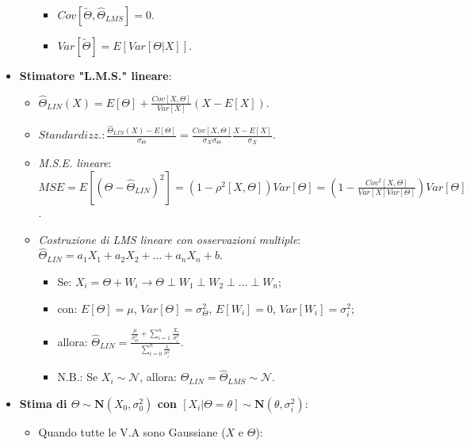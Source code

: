 \documentclass[8pt]{extarticle}
\begin{document}
\begin{multicols*}{3}
\begin{itemize}
\begin{itemize}
\begin{itemize}
                            \item $Cov[\widetilde{\Theta}, \hat{\Theta}_{LMS}]=0$.
                            \item $Var[\widetilde{\Theta}]=E[Var[\Theta|X]]$.
                        \end{itemize}
              \end{itemize}
        \item \textbf{Stimatore "L.M.S." lineare}:
              \begin{itemize}
                  \item $\hat{\Theta}_{LIN}(X)=E[\Theta]+\frac{Cov[X, \Theta]}{Var[X]}(X-E[X]).$
                  \item $Standardizz.: \frac{\hat{\Theta}_{LIN}(X)-E[\Theta]}{\sigma_{\Theta}}=\frac{Cov[X,\Theta]}{\sigma_{X}\sigma_{\Theta}}\frac{X-E[X]}{\sigma_{X}}$.
                  \item \textit{M.S.E. lineare}: $MSE=E[(\Theta-\hat{\Theta}_{LIN})^2]=(1-\rho^{2}[X,\Theta])Var[\Theta]=(1-\frac{Cov^{2}[X,\Theta]}{Var[X]Var[\Theta]})Var[\Theta]$.
                  \item \textit{Costruzione di LMS lineare con osservazioni multiple}: $\hat{\Theta}_{LIN}=a_{1}X_{1}+a_{2}X_{2}+...+a_{n}X_{n}+b$.
                        \begin{itemize}
                            \item Se: $X_{i}=\Theta + W_{i}\rightarrow \Theta\perp W_{1}\perp W_{2}\perp ...\perp W_{n}$;
                            \item con: $E[\Theta]=\mu$, $Var[\Theta]=\sigma^{2}_{\Theta}$, $E[W_{i}]=0$, $Var[W_{i}]=\sigma^{2}_{i}$;
                            \item allora: $\hat{\Theta}_{LIN}=\frac{\frac{\mu}{\sigma^{2}_{\Theta}}+\sum_{i=1}^{n}\frac{X_{i}}{\sigma^{2}_{i}}}{\sum_{i=0}^{n}\frac{1}{\sigma^{2}_{i}}}$.
                            \item N.B.: Se $X_{i}\sim\mathcal{N}$, allora: $\hat{\Theta}_{LIN}=\hat{\Theta}_{LMS}\sim\mathcal{N}$.
                        \end{itemize}
              \end{itemize}
        \item \textbf{Stima di $\Theta \sim \mathbf{N}(X_{0},\sigma_{0}^{2})$ con $[X_{i}|\Theta=\theta]\sim \mathbf{N}(\theta, \sigma_{i}^{2})$}:
            \begin{itemize}
                \item Quando tutte le V.A sono Gaussiane ($X$ e $\Theta$): 


\end{itemize}
\end{itemize}
\end{multicols*}
\end{document}
